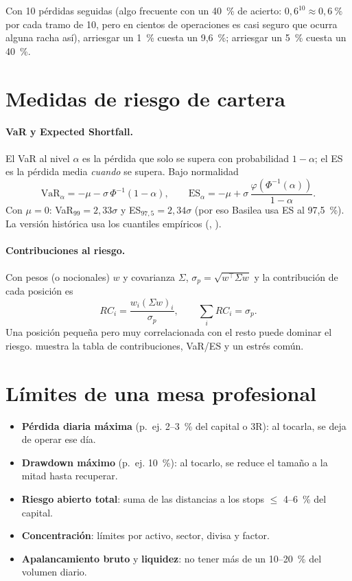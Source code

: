 Con 10 pérdidas seguidas (algo frecuente con un 40~\% de acierto: $0{,}6^{10}\approx0{,}6~\%$ por
cada tramo de 10, pero en cientos de operaciones es casi seguro que ocurra alguna racha así), arriesgar
un 1~\% cuesta un 9,6~\%; arriesgar un 5~\% cuesta un 40~\%.

\section{Medidas de riesgo de cartera}
\paragraph{VaR y Expected Shortfall.} El VaR al nivel $\alpha$ es la pérdida que solo se supera con
probabilidad $1-\alpha$; el ES es la pérdida media \emph{cuando} se supera. Bajo normalidad
\begin{equation}
\text{VaR}_\alpha = -\mu - \sigma\,\Phi^{-1}(1-\alpha),\qquad
\text{ES}_\alpha = -\mu + \sigma\,\frac{\varphi(\Phi^{-1}(\alpha))}{1-\alpha}.
\end{equation}
Con $\mu=0$: VaR$_{99}=2{,}33\sigma$ y ES$_{97,5}=2{,}34\sigma$ (por eso Basilea usa ES al 97,5~\%).
La versión histórica usa los cuantiles empíricos (, ).

\paragraph{Contribuciones al riesgo.} Con pesos (o nocionales) $w$ y covarianza $\Sigma$,
$\sigma_p=\sqrt{w^\top\Sigma w}$ y la contribución de cada posición es
\begin{equation}
RC_i = \frac{w_i (\Sigma w)_i}{\sigma_p},\qquad \sum_i RC_i = \sigma_p .
\end{equation}
Una posición pequeña pero muy correlacionada con el resto puede dominar el riesgo.
 muestra la tabla de contribuciones, VaR/ES y un estrés común.

\section{Límites de una mesa profesional}
\begin{itemize}
\item \textbf{Pérdida diaria máxima} (p.~ej. 2--3~\% del capital o 3R): al tocarla, se deja de operar ese día.
\item \textbf{Drawdown máximo} (p.~ej. 10~\%): al tocarlo, se reduce el tamaño a la mitad hasta recuperar.
\item \textbf{Riesgo abierto total}: suma de las distancias a los stops $\le$ 4--6~\% del capital.
\item \textbf{Concentración}: límites por activo, sector, divisa y factor.
\item \textbf{Apalancamiento bruto} y \textbf{liquidez}: no tener más de un 10--20~\% del volumen diario.
\end{itemize}

